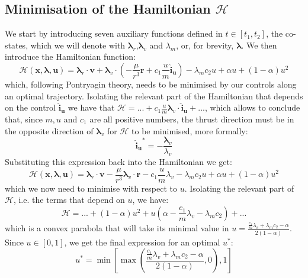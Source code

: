 \documentclass[graybox]{svmult}
\begin{document}
\subsection {Minimisation of the Hamiltonian $\mathcal H$}
We start by introducing seven auxiliary functions defined in $t \in [t_1, t_2]$, the co-states, which we will denote with $\boldsymbol \lambda_r$,$\boldsymbol \lambda_v$ and $ \lambda_m$, or, for brevity, $\boldsymbol \lambda$. We then introduce the Hamiltonian function:
\begin{equation}
\label{eq:hamiltonian}
\mathcal H(\mathbf x, \boldsymbol \lambda, \mathbf u) = \boldsymbol \lambda_r \cdot \mathbf v + \boldsymbol \lambda_v \cdot \left(-\frac{\mu}{r^3}\mathbf r + c_1 \frac {u}m \mathbf{\hat i_u}\right) - \lambda_m c_2 u 
 + \alpha u + (1-\alpha) u^2
\end{equation}
which, following Pontryagin theory, needs to be minimised by our controls along an optimal trajectory. Isolating the relevant part of the Hamiltonian that depends on the control $\mathbf{\hat i_u}$ we have that $\mathcal H = ... + c_1 \frac um \boldsymbol \lambda_v \cdot \mathbf{\hat i_u} + ... $, which allows to conclude that, since $m, u$ and $c_1$ are all positive numbers, the thrust direction must be in the opposite direction of $\boldsymbol \lambda_v$ for $\mathcal H$ to be minimised, more formally:
\begin{equation}\label{eq:primer}
\mathbf{\hat i_u}^* = -\frac{\boldsymbol \lambda_v}{\lambda_v}
\end{equation}
Substituting this expression back into the Hamiltonian we get:
\begin{equation*}
\label{eq:hamiltonian}
\mathcal H(\mathbf x, \boldsymbol \lambda, \mathbf u) = \boldsymbol \lambda_r \cdot \mathbf v 
- \frac{\mu}{r^3} \boldsymbol \lambda_v \cdot \mathbf r  - c_1 \frac um \lambda_v
- \lambda_m c_2 u  + \alpha u + (1-\alpha) u^2
\end{equation*}
which we now need to minimise with respect to $u$. Isolating the relevant part of $\mathcal H$, i.e. the terms that depend on $u$, we have:
$$
\mathcal H = ... + (1-\alpha) u^2 + u \left( \alpha  - \frac {c_1}m \lambda_v - \lambda_m c_2 \right) + ...
$$
which is a convex parabola that will take its minimal value in $u = \frac{\frac {c_1}m \lambda_v + \lambda_m c_2 - \alpha }{ 2 (1-\alpha)}$. Since $u \in [0,1]$, we get the final expression for an optimal $u^*$:
\begin{equation}\label{eq:optimalu}
u^* = \min\left[\max\left( \frac{\frac {c_1}m \lambda_v + \lambda_m c_2 - \alpha }{ 2 (1-\alpha)}, 0 \right)  ,1\right]
\end{equation}
\end{document}
